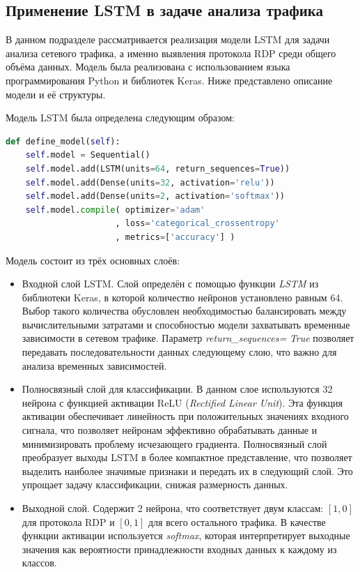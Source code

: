 \documentclass[bachelor, och, coursework]{SCWorks}
\begin{document}
\subsection{Применение LSTM в задаче анализа трафика}

В данном подразделе рассматривается реализация модели LSTM для задачи анализа сетевого трафика, а именно выявления протокола RDP среди общего объёма 
данных. Модель была реализована с использованием языка программирования Python и библиотек Keras. Ниже представлено описание модели и её структуры.

Модель LSTM была определена следующим образом:

\begin{lstlisting}[language=Python, caption=Определение модели LSTM]
  def define_model(self):
    self.model = Sequential()
    self.model.add(LSTM(units=64, return_sequences=True))
    self.model.add(Dense(units=32, activation='relu'))
    self.model.add(Dense(units=2, activation='softmax'))
    self.model.compile( optimizer='adam'
                      , loss='categorical_crossentropy'
                      , metrics=['accuracy'] )
\end{lstlisting}

Модель состоит из трёх основных слоёв:
\begin{itemize}
    \item Входной слой LSTM. Слой определён с помощью функции \textit{LSTM} из библиотеки Keras, в которой количество нейронов 
    установлено равным 64. Выбор такого количества обусловлен необходимостью балансировать между вычислительными затратами и способностью 
    модели захватывать временные зависимости в сетевом трафике. Параметр \textit{return\_sequences=} \textit{True} позволяет передавать последовательности 
    данных следующему слою, что важно для анализа временных зависимостей.
    
    \item Полносвязный слой для классификации. В данном слое используются 32 нейрона с функцией активации ReLU (\textit{Rectified Linear Unit}). 
    Эта функция активации обеспечивает линейность при положительных значениях входного сигнала, что позволяет нейронам эффективно обрабатывать данные и 
    минимизировать проблему исчезающего градиента. Полносвязный слой преобразует выходы LSTM в более компактное представление, что позволяет выделить 
    наиболее значимые признаки и передать их в следующий слой. Это упрощает задачу классификации, снижая размерность данных.
    
    \item Выходной слой. Содержит 2 нейрона, что соответствует двум классам: \([1, 0]\) для протокола RDP и \([0, 1]\) для всего остального 
    трафика. В качестве функции активации используется \textit{softmax}, которая интерпретирует выходные значения как вероятности принадлежности входных 
    данных к каждому из классов.
\end{itemize}
\end{document}
